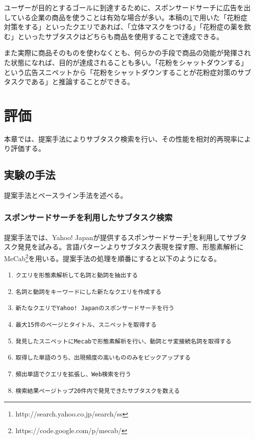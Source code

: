 \documentclass[submit,techreq]{ipsj}
\def\|{\verb|}
\begin{document}
ユーザーが目的とするゴールに到達するために、スポンサードサーチに広告を出している企業の商品を使うことは有効な場合が多い。本稿の\ref{sec:evaluate}で用いた「花粉症対策をする」といったクエリであれば、「立体マスクをつける」「花粉症の薬を飲む」といったサブタスクはどちらも商品を使用することで達成できる。

また実際に商品そのものを使わなくとも、何らかの手段で商品の効能が発揮された状態になれば、目的が達成されることも多い。「花粉をシャットダウンする」という広告スニペットから「花粉をシャットダウンすることが花粉症対策のサブタスクである」と推論することができる。



%4
\section{評価}
\label{sec:evaluate}
本章では、提案手法によりサブタスク検索を行い、その性能を相対的再現率により評価する。

%4.1
\subsection{実験の手法}
提案手法とベースライン手法を述べる。

%4.1.1
\subsubsection{スポンサードサーチを利用したサブタスク検索}
\label{sec:sp}

提案手法では、Yahoo! Japanが提供するスポンサードサーチ\footnote{http://search.yahoo.co.jp/search/ss}を利用してサブタスク発見を試みる。言語パターンよりサブタスク表現を探す際、形態素解析にMeCab\footnote{https://code.google.com/p/mecab/}を用いる。提案手法の処理を順番にすると以下のようになる。

\begin{enumerate}
\item \|クエリを形態素解析して名詞と動詞を抽出する|
\item \|名詞と動詞をキーワードにした新たなクエリを作成する|
\item \|新たなクエリでYahoo! Japanのスポンサードサーチを行う|
\item \|最大15件のページとタイトル、スニペットを取得する|
\item \|発見したスニペットにMecabで形態素解析を行い、動詞とサ変接続名詞を取得する|
\item \|取得した単語のうち、出現頻度の高いもののみをピックアップする|
\item \|頻出単語でクエリを拡張し、Web検索を行う|
\item \|検索結果ページトップ20件内で発見できたサブタスクを数える|
\end{enumerate}
\end{document}
